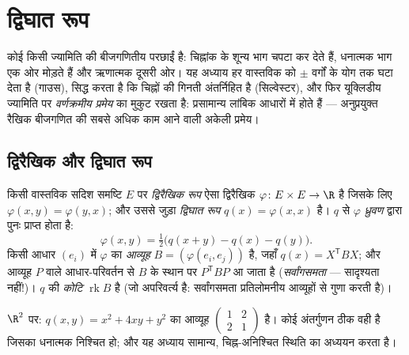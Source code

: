 \chapter{द्विघात रूप}\label{ch:b2:quadratic}

कोई  किसी ज्यामिति की बीजगणितीय परछाईं है: चिह्नांक के शून्य
भाग चपटा कर देते हैं, धनात्मक भाग एक ओर मोड़ते हैं और ऋणात्मक दूसरी ओर।
यह अध्याय हर वास्तविक  को $\pm$ वर्गों के योग तक घटा देता है
(गाउस), सिद्ध करता है कि चिह्नों की गिनती अंतर्निहित है (सिल्वेस्टर), और
फिर यूक्लिडीय ज्यामिति पर \emph{वर्णक्रमीय प्रमेय} का मुकुट रखता है:
 प्रसामान्य लांबिक आधारों में  होते हैं ---
अनुप्रयुक्त रैखिक बीजगणित की सबसे अधिक काम आने वाली अकेली प्रमेय।

\section{द्विरैखिक और द्विघात रूप}

\begin{definition}\label{def:b2:quadratic:def}
किसी वास्तविक सदिश समष्टि $E$ पर \emph{ द्विरैखिक रूप} ऐसा
द्विरैखिक $\varphi \colon E \times E \to \R$ है जिसके लिए $\varphi(x, y) =
\varphi(y, x)$; और उससे जुड़ा \emph{द्विघात
रूप} $q(x) = \varphi(x, x)$ है। $q$ से $\varphi$ \emph{ध्रुवण} द्वारा पुनः प्राप्त होता है:
\[
\varphi(x, y) = \tfrac12\bigl(q(x + y) - q(x) - q(y)\bigr).
\]
किसी आधार $(e_i)$ में $\varphi$ का \emph{आव्यूह}  $B = (\varphi(e_i, e_j))$ है, जहाँ $q(x) = X^{\mathsf T} B X$; और
आव्यूह $P$ वाले आधार-परिवर्तन से $B$ के स्थान पर $P^{\mathsf T} B P$ आ जाता है
(\emph{सर्वांगसमता} --- सादृश्यता नहीं!)। $q$ की
\emph{कोटि} $\operatorname{rk} B$ है (जो अपरिवर्त्य है: सर्वांगसमता प्रतिलोमनीय आव्यूहों
से गुणा करती है)।
\end{definition}

\begin{example}
$\R^2$ पर: $q(x, y) = x^2 + 4xy + y^2$ का आव्यूह $\begin{pmatrix}
1 & 2\\ 2 & 1\end{pmatrix}$ है। कोई अंतर्गुणन ठीक वही 
है जिसका  धनात्मक निश्चित हो; और यह अध्याय सामान्य, चिह्न-अनिश्चित
स्थिति का अध्ययन करता है।
\end{example}

